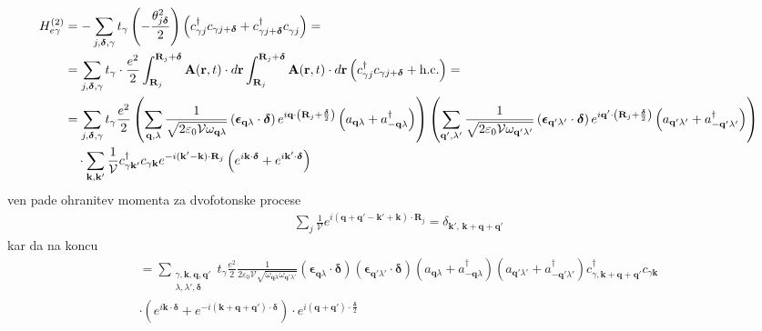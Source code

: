 \documentclass[a4paper,10pt]{article}
\renewcommand{\vec}[1]{\mathbf{#1}}
\begin{document}
\begin{align}
  H_{e\gamma}^{(2)} &= -\sum_{j, \bm{\delta}, \gamma} t_\gamma \left( -\frac{\theta_{j\bm{\delta}}^2}{2} \right) \left( c_{\gamma j}^\dagger c_{\gamma j + \bm{\delta}} + c_{\gamma j + \bm{\delta}}^\dagger c_{\gamma j}^{\vphantom{\dagger}}\right) = \\ &= \sum_{j, \bm{\delta}, \gamma} t_\gamma \cdot \frac{e^2}{2} \int_{\vec{R}_j}^{\vec{R}_j + \bm{\delta}} \vec{A}(\vec{r}, t) \cdot d\vec{r} \int_{\vec{R}_j}^{\vec{R}_j + \bm{\delta}} \vec{A}(\vec{r}, t) \cdot d\vec{r} \left( c_{\gamma j}^\dagger c_{\gamma j + \bm{\delta}} + \text{h.c.} \right) = \\ &= \sum_{j, \bm{\delta}, \gamma} t_\gamma \frac{e^2}{2} \left( \sum_{\vec{q}, \lambda} \frac{1}{\sqrt{2\varepsilon_0 \mathcal{V} \omega_{\vec{q}\lambda}}} \left( \bm{\epsilon}_{\vec{q}\lambda} \cdot \bm{\delta} \right) e^{i \vec{q} \cdot \left(\vec{R}_j + \frac{\bm{\delta}}{2}\right)} \left( a_{\vec{q}\lambda} + a_{-\vec{q}\lambda}^\dagger \right) \right) \left( \sum_{\vec{q}', \lambda'} \frac{1}{\sqrt{2\varepsilon_0 \mathcal{V} \omega_{\vec{q}'\lambda'}}} \left( \bm{\epsilon}_{\vec{q}'\lambda'} \cdot \bm{\delta} \right) e^{i \vec{q}' \cdot \left(\vec{R}_j + \frac{\bm{\delta}}{2}\right)} \left( a_{\vec{q}'\lambda'} + a_{-\vec{q}'\lambda'}^\dagger \right) \right) \\ &\quad \cdot \sum_{\vec{k}, \vec{k}'} \frac{1}{\mathcal{V}} c_{\gamma \vec{k}'}^\dagger c_{\gamma \vec{k}} e^{-i(\vec{k}' - \vec{k}) \cdot \vec{R}_j} \left( e^{i \vec{k} \cdot \bm{\delta}} + e^{i \vec{k}' \cdot \bm{\delta}} \right)
\end{align}
ven pade ohranitev momenta za dvofotonske procese
\begin{align}
  \sum_j \frac{1}{\mathcal{V}} e^{i \left( \vec{q} + \vec{q}' - \vec{k}' + \vec{k} \right) \cdot \vec{R}_j} = \delta_{\vec{k}',\, \vec{k} + \vec{q} + \vec{q}'}
\end{align}
kar da na koncu 
\begin{align}
  = \sum_{\substack{\gamma, \vec{k}, \vec{q}, \vec{q}' \\ \lambda, \lambda', \bm{\delta}}} t_\gamma \frac{e^2}{2} \frac{1}{2\varepsilon_0 \mathcal{V} \sqrt{\omega_{\vec{q}\lambda} \omega_{\vec{q}'\lambda'}}} \left( \bm{\epsilon}_{\vec{q}\lambda} \cdot \bm{\delta} \right) \left( \bm{\epsilon}_{\vec{q}'\lambda'} \cdot \bm{\delta} \right) \left( a_{\vec{q}\lambda} + a_{-\vec{q}\lambda}^\dagger \right) \left( a_{\vec{q}'\lambda'} + a_{-\vec{q}'\lambda'}^\dagger \right) c_{\gamma, \vec{k} + \vec{q} + \vec{q}'}^\dagger c_{\gamma \vec{k}} \\ \cdot \left( e^{i \vec{k} \cdot \bm{\delta}} + e^{-i (\vec{k} + \vec{q} + \vec{q}') \cdot \bm{\delta}} \right) \cdot e^{i (\vec{q} + \vec{q}') \cdot \frac{\bm{\delta}}{2}}
\end{align}
\end{document}
